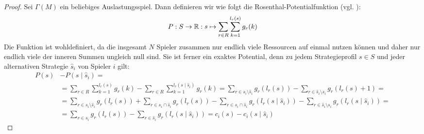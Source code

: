 \begin{proof}
	Sei $\Gamma(M)$ ein beliebiges Auslastungsspiel. Dann definieren wir wie folgt die Rosenthal-Potentialfunktion (vgl. \cite{RosenthalPotential}):
		\[P: S \to \mathbb{R}: s \mapsto \sum_{r \in R}\sum_{k=1}^{l_r(s)} g_r(k) \]
	Die Funktion ist wohldefiniert, da die insgesamt $N$ Spieler zusammen nur endlich viele Ressourcen auf einmal nutzen können und daher nur endlich viele der inneren Summen ungleich null sind. Sie ist ferner ein exaktes Potential, denn zu jedem Strategieprofil $s \in S$ und jeder alternativen Strategie $\hat{s}_i$ von Spieler $i$ gilt:
	\begin{align*}
		P(s) 	&- P(s\mid \hat{s}_i) =\\
				&= \sum_{r \in R}\sum_{k=1}^{l_r(s)} g_r(k) - \sum_{r \in R}\sum_{k=1}^{l_r(s\mid \hat{s}_i)} g_r(k) = \sum_{r \in s_i \setminus \hat{s}_i} g_r(l_r(s)) - \sum_{r \in \hat{s}_i \setminus s_i} g_r(l_r(s)+1) = \\
				&= \sum_{r \in s_i \setminus \hat{s}_i} g_r(l_r(s)) + \sum_{r \in s_i \cap \hat{s}_i} g_r(l_r(s)) - \sum_{r \in s_i \cap \hat{s}_i} g_r(l_r(s \mid \hat{s}_i)) - \sum_{r \in \hat{s}_i \setminus s_i} g_r(l_r(s\mid \hat{s}_i)) = \\
				&= \sum_{r \in s_i} g_r(l_r(s)) - \sum_{r \in \hat{s}_i} g_r(l_r(s\mid \hat{s}_i)) = c_i(s) - c_i(s \mid \hat{s}_i)
	\end{align*}
	

\end{proof}
